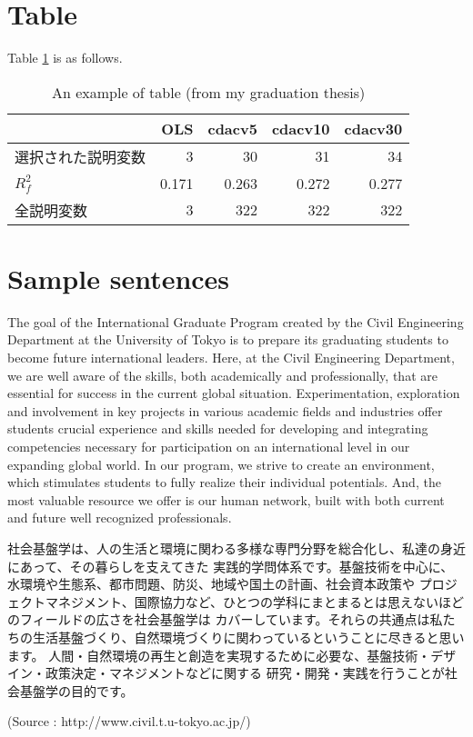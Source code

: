 \documentclass[english,a4paper]{jsarticle}
\begin{document}
\section{Table}
Table \ref{table1} is as follows.
\begin{table}[H]
	\begin{center}
		\caption{An example of table (from my graduation thesis)}
		\begin{tabular}{l|rrrr}
			& OLS & cdacv5 & cdacv10 & cdacv30\\ \hline
			選択された説明変数 & 3 & 30 & 31 & 34\\
			$R_f^2$ & 0.171 & 0.263 & 0.272 & 0.277\\
			全説明変数 & 3 & 322 & 322 & 322\\
		\end{tabular}
		\label{table1}
	\end{center}
\end{table}

\section{Sample sentences}
The goal of the International Graduate Program created by the Civil Engineering 
Department at the University of Tokyo is to prepare its graduating students 
to become future international leaders. Here, at the Civil Engineering Department, 
we are well aware of the skills, both academically and professionally, 
that are essential for success in the current global situation. Experimentation, 
exploration and involvement in key projects in various academic fields and industries 
offer students crucial experience and skills needed for developing and 
integrating competencies necessary for participation on an international level 
in our expanding global world. 
In our program, we strive to create an environment, which stimulates students 
to fully realize their individual potentials. And, the most valuable resource we offer 
is our human network, built with both current and future well recognized professionals.

\vspace{\baselineskip}%
社会基盤学は、人の生活と環境に関わる多様な専門分野を総合化し、私達の身近にあって、その暮らしを支えてきた
実践的学問体系です。基盤技術を中心に、水環境や生態系、都市問題、防災、地域や国土の計画、社会資本政策や
プロジェクトマネジメント、国際協力など、ひとつの学科にまとまるとは思えないほどのフィールドの広さを社会基盤学は
カバーしています。それらの共通点は私たちの生活基盤づくり、自然環境づくりに関わっているということに尽きると思います。
人間・自然環境の再生と創造を実現するために必要な、基盤技術・デザイン・政策決定・マネジメントなどに関する
研究・開発・実践を行うことが社会基盤学の目的です。

(Source : http://www.civil.t.u-tokyo.ac.jp/)
\end{document}
